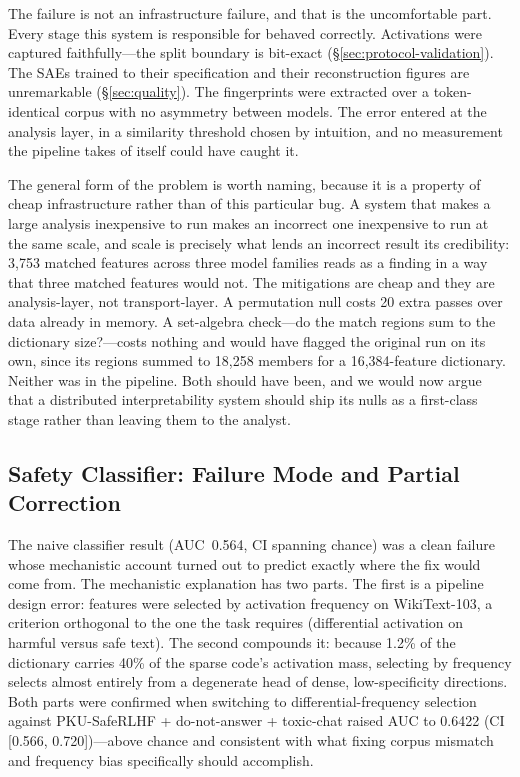 \documentclass[11pt]{article}
\begin{document}
The failure is not an infrastructure failure, and that is the uncomfortable part. Every stage this system is responsible for behaved correctly. Activations were captured faithfully---the split boundary is bit-exact (\S\ref{sec:protocol-validation}). The SAEs trained to their specification and their reconstruction figures are unremarkable (\S\ref{sec:quality}). The fingerprints were extracted over a token-identical corpus with no asymmetry between models. The error entered at the analysis layer, in a similarity threshold chosen by intuition, and no measurement the pipeline takes of itself could have caught it.

The general form of the problem is worth naming, because it is a property of cheap infrastructure rather than of this particular bug. A system that makes a large analysis inexpensive to run makes an incorrect one inexpensive to run at the same scale, and scale is precisely what lends an incorrect result its credibility: 3,753 matched features across three model families reads as a finding in a way that three matched features would not. The mitigations are cheap and they are analysis-layer, not transport-layer. A permutation null costs 20 extra passes over data already in memory. A set-algebra check---do the match regions sum to the dictionary size?---costs nothing and would have flagged the original run on its own, since its regions summed to 18,258 members for a 16,384-feature dictionary. Neither was in the pipeline. Both should have been, and we would now argue that a distributed interpretability system should ship its nulls as a first-class stage rather than leaving them to the analyst.

\subsection{Safety Classifier: Failure Mode and Partial Correction}
\label{sec:safety-discussion}

The naive classifier result (AUC~0.564, CI spanning chance) was a clean failure whose mechanistic account turned out to predict exactly where the fix would come from. The mechanistic explanation has two parts. The first is a pipeline design error: features were selected by activation frequency on WikiText-103, a criterion orthogonal to the one the task requires (differential activation on harmful versus safe text). The second compounds it: because 1.2\% of the dictionary carries 40\% of the sparse code's activation mass, selecting by frequency selects almost entirely from a degenerate head of dense, low-specificity directions. Both parts were confirmed when switching to differential-frequency selection against PKU-SafeRLHF + do-not-answer + toxic-chat raised AUC to 0.6422 (CI [0.566, 0.720])---above chance and consistent with what fixing corpus mismatch and frequency bias specifically should accomplish.
\end{document}
